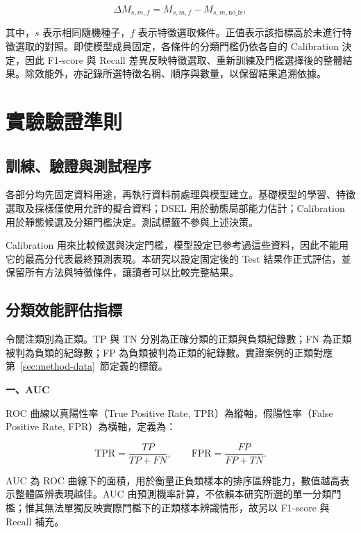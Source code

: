 \begin{equation}\label{eq:method-delta}
\Delta M_{s,m,f}
=M_{s,m,f}-M_{s,m,\mathrm{no\_fs}},
\end{equation}

其中，\(s\) 表示相同隨機種子，\(f\) 表示特徵選取條件。正值表示該指標高於未進行特徵選取的對照。即使模型成員固定，各條件的分類門檻仍依各自的 Calibration 決定，因此 F1-score 與 Recall 差異反映特徵選取、重新訓練及門檻選擇後的整體結果。除效能外，亦記錄所選特徵名稱、順序與數量，以保留結果追溯依據。

\section{實驗驗證準則}\label{sec:method-validation}

\subsection{訓練、驗證與測試程序}

各部分均先固定資料用途，再執行資料前處理與模型建立。基礎模型的學習、特徵選取及採樣僅使用允許的擬合資料；DSEL 用於動態局部能力估計；Calibration 用於靜態候選及分類門檻決定。測試標籤不參與上述決策。

Calibration 用來比較候選與決定門檻，模型設定已參考過這些資料，因此不能用它的最高分代表最終預測表現。本研究以設定固定後的 Test 結果作正式評估，並保留所有方法與特徵條件，讓讀者可以比較完整結果。

\subsection{分類效能評估指標}

令關注類別為正類。TP 與 TN 分別為正確分類的正類與負類紀錄數；FN 為正類被判為負類的紀錄數；FP 為負類被判為正類的紀錄數。實證案例的正類對應第~\ref{sec:method-data}~節定義的標籤。

\textbf{一、AUC}

ROC 曲線以真陽性率（True Positive Rate, TPR）為縱軸，假陽性率（False Positive Rate, FPR）為橫軸，定義為：

\begin{equation}\label{eq:method-roc}
\mathrm{TPR}=\frac{TP}{TP+FN},\qquad
\mathrm{FPR}=\frac{FP}{FP+TN}.
\end{equation}

AUC 為 ROC 曲線下的面積，用於衡量正負類樣本的排序區辨能力，數值越高表示整體區辨表現越佳。AUC 由預測機率計算，不依賴本研究所選的單一分類門檻；惟其無法單獨反映實際門檻下的正類樣本辨識情形，故另以 F1-score 與 Recall 補充。

